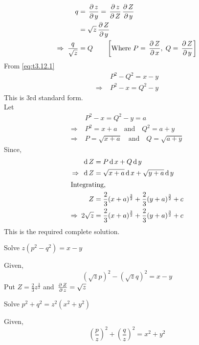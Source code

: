 \documentclass[../main-sheet.tex]{subfiles}
\begin{document}
\begin{enumerate}[label=\underline{Type - \Roman*}:]
\begin{soln}
\begin{align*}
            q&=\,\frac{\partial\, z}{\partial\, y}=\,\frac{\partial\, z}{\partial\, Z}\,\frac{\partial\, Z}{\partial\, y}\\
            &=\sqrt{z}\,\frac{\partial\, Z}{\partial\, y}\\
            \Rightarrow\;\frac{q}{\sqrt{z}}&=Q\qquad\left[\text{Where } P=\,\frac{\partial\, Z}{\partial\, x},\;Q=\,\frac{\partial\, Z}{\partial\, y}\right]
        \end{align*}
        From \eqref{eq:t3.12.1}
        \begin{align*}
            &P^2-Q^2=x-y\\
            \Rightarrow\;&P^2-x=Q^2-y
        \end{align*}
        This is 3rd standard form.\\
        Let 
        \begin{align*}
            &P^2-x=Q^2-y=a\\
            \Rightarrow\;&P^2=x+a\quad \text{and}\quad Q^2=a+y\\
            \Rightarrow\;&P=\sqrt{x+a}\quad \text{and}\quad Q=\sqrt{a+y}
        \end{align*}
        Since,
        \begin{align*}
            \,\mathrm{d}\, Z&=P \,\mathrm{d}\, x+Q\,\mathrm{d}\, y\\
            \Rightarrow\;\,\mathrm{d}\, Z&=\sqrt{x+a}\,\mathrm{d}\, x+\sqrt{y+a}\,\mathrm{d}\, y\\
            \intertext{Integrating,}
            Z&=\frac{2}{3}(x+a)^{\frac{3}{2}}+\frac{2}{3}(y+a)^{\frac{3}{2}}+c\\
            \Rightarrow\;2\sqrt{z}&=\frac{2}{3}(x+a)^{\frac{3}{2}}+\frac{2}{3}(y+a)^{\frac{3}{2}}+c
        \end{align*}
        This is the required complete solution.
    \end{soln}
    \begin{prob}
        Solve \(z(p^2-q^2)=x-y\)
    \end{prob}
    \begin{soln}
        Given,
        \begin{equation}
            \left(\sqrt{z}p\right)^2-\left(\sqrt{z}q\right)^2=x-y
        \end{equation}
        Put \(Z=\frac{2}{3}z^{\frac{3}{2}}\) and \(\,\frac{\partial\, Z}{\partial\, z}=\sqrt{z}\)
    \end{soln}
    \begin{prob}
        Solve \(p^2+q^2=z^2(x^2+y^2)\)
    \end{prob}
    \begin{soln}
        Given,
        \begin{equation}
            \left(\frac{p}{z}\right)^2+\left(\frac{q}{z}\right)^2=x^2+y^2

\end{equation}
\end{soln}
\end{enumerate}
\end{document}
